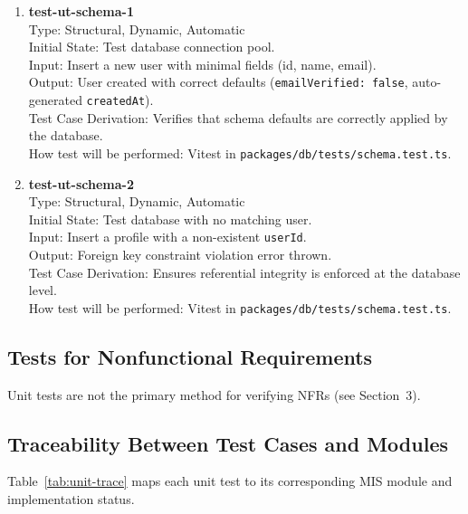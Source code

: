 \documentclass[12pt, titlepage]{article}
\begin{document}
\begin{enumerate}
\item \textbf{test-ut-schema-1}\\
Type: Structural, Dynamic, Automatic\\
Initial State: Test database connection pool.\\
Input: Insert a new user with minimal fields (id, name, email).\\
Output: User created with correct defaults (\texttt{emailVerified: false}, auto-generated \texttt{createdAt}).\\
Test Case Derivation: Verifies that schema defaults are correctly applied by the database.\\
How test will be performed: Vitest in \texttt{packages/db/tests/schema.test.ts}.\\

\item \textbf{test-ut-schema-2}\\
Type: Structural, Dynamic, Automatic\\
Initial State: Test database with no matching user.\\
Input: Insert a profile with a non-existent \texttt{userId}.\\
Output: Foreign key constraint violation error thrown.\\
Test Case Derivation: Ensures referential integrity is enforced at the database level.\\
How test will be performed: Vitest in \texttt{packages/db/tests/schema.test.ts}.\\
\end{enumerate}

\subsection{Tests for Nonfunctional Requirements}
Unit tests are not the primary method for verifying NFRs (see Section~3).

\subsection{Traceability Between Test Cases and Modules}

Table~\ref{tab:unit-trace} maps each unit test to its corresponding MIS module and implementation status.
\end{document}
